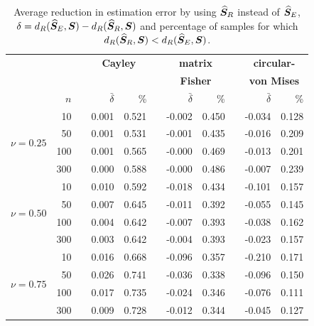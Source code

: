 \begin{table}[h!]
\caption{Average reduction in estimation error by using ${\widehat{\bm S}_R}$ instead of ${\widehat{\bm S}_E}$, $\delta={d_R}({\widehat{\bm S}_E},\bm S) - {d_R}({\widehat{\bm S}_R},\bm S)$ and percentage of samples for which ${d_R}({\widehat{\bm S}_R},\bm S) < {d_R}({\widehat{\bm S}_E},\bm S)$.  \label{tab:percL2}}
\begin{center}
\begin{tabular}{rrcrrcrrcrr}
  \hline
  & &&\multicolumn{2}{c}{\textbf{Cayley}} & &\multicolumn{2}{c}{\textbf{matrix} } &&\multicolumn{2}{c}{\textbf{circular-}}\\
    && &\multicolumn{2}{c}{} & &\multicolumn{2}{c}{\textbf{Fisher}} & &\multicolumn{2}{c}{\textbf{von Mises}}\\ 
\rule[2mm]{0mm}{3mm} 
  &  $n$ && $\bar{\delta}$ & \% & & $\bar{\delta}$ & \% & & $\bar{\delta}$ & \% \\ 
  \hline \hline
\multirow{4}{*}{$\nu=0.25$}
  &   10 &&  0.001 & 0.521 &&  -0.002 & 0.450 && -0.034 & 0.128 \\  
  &   50 && 0.001 & 0.531 &&  -0.001 & 0.435 && -0.016 & 0.209 \\\ 
  &  100 && 0.001 & 0.565 &&  -0.000 & 0.469 && -0.013 & 0.201 \\
  &  300 && 0.000 & 0.588 &&  -0.000 & 0.486 &&  -0.007 & 0.239 \\ \hline
  \multirow{4}{*}{$\nu=0.50$}
   &   10 &&   0.010 & 0.592 &&  -0.018 & 0.434 &&  -0.101 & 0.157 \\ 
   &   50 &&  0.007 & 0.645 &&  -0.011 & 0.392 &&  -0.055 & 0.145 \\ 
   &  100 &&   0.004 & 0.642 &&  -0.007 & 0.393 &&  -0.038 & 0.162 \\ 
   &  300 &&   0.003 & 0.642 &&  -0.004 & 0.393 &&  -0.023 & 0.157 \\ \hline
  \multirow{4}{*}{$\nu=0.75$}
   &   10 &&   0.016 & 0.668 &&  -0.096 & 0.357 &&  -0.210 & 0.171 \\ 
   &   50 &&  0.026 & 0.741 &&  -0.036 & 0.338 &&  -0.096 & 0.150 \\
   &  100 &&  0.017 & 0.735 &&  -0.024 & 0.346 &&  -0.076 & 0.111 \\ 
   &  300 &&  0.009 & 0.728 &&  -0.012 & 0.344 && -0.045 & 0.127 \\ 
   \hline
\end{tabular}
\end{center}
\end{table}

